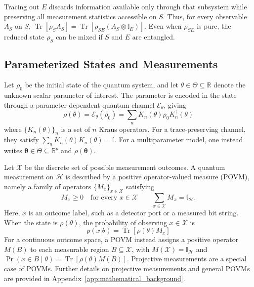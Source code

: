 \begin{remark}
    Tracing out $E$ discards information available only through that subsystem while preserving all measurement statistics accessible on $S$. Thus, for every observable $A_S$ on $S$, $\operatorname{Tr}[\rho_S A_S]=\operatorname{Tr}[\rho_{SE}(A_S\otimes\mathbb{I}_E)]$. Even when $\rho_{SE}$ is pure, the reduced state $\rho_S$ can be mixed if $S$ and $E$ are entangled.
\end{remark}

\subsection{Parameterized States and Measurements}

\begin{definition}
    Let $\rho_0$ be the initial state of the quantum system, and let $\theta\in\Theta\subseteq\mathbb{R}$ denote the unknown scalar parameter of interest. The parameter is encoded in the state through a parameter-dependent quantum channel $\mathcal{E}_\theta$, giving
    \begin{equation}
        \rho(\theta)
        = \mathcal{E}_\theta(\rho_0)
        = \sum_n K_n(\theta)\rho_0K_n^\dagger(\theta)
    \end{equation}
    where $\{K_n(\theta)\}_n$ is a set of $n$ Kraus operators. For a trace-preserving channel, they satisfy $\sum_n K_n^\dagger(\theta)K_n(\theta)=\mathbb{I}$.
    For a multiparameter model, one instead writes $\boldsymbol{\theta}\in\Theta\subseteq\mathbb{R}^p$ and $\rho(\boldsymbol{\theta})$.
\end{definition}


\begin{definition}
    Let $\mathcal{X}$ be the discrete set of possible measurement outcomes. A quantum measurement on $\mathcal{H}$ is described by a positive operator-valued measure (POVM), namely a family of operators $\{M_x\}_{x\in\mathcal{X}}$ satisfying
    \begin{equation}
        M_x\geq 0 \quad \text{for every }x\in\mathcal{X}
        \qquad
        \sum_{x\in\mathcal{X}} M_x=\mathbb{I}_{\mathcal{H}}.
    \end{equation}
    Here, $x$ is an outcome label, such as a detector port or a measured bit string. When the state is $\rho(\theta)$, the probability of observing $x\in\mathcal{X}$ is
    \begin{equation}
        p(x|\theta)
        =\operatorname{Tr}\!\left[\rho(\theta)M_x\right]
        \label{eq:povm_def}
    \end{equation}
    For a continuous outcome space, a POVM instead assigns a positive operator $M(B)$ to each measurable region $B\subseteq\mathcal{X}$, with $M(\mathcal{X})=\mathbb{I}_{\mathcal{H}}$ and $\Pr(x\in B\mid\theta)=\operatorname{Tr}[\rho(\theta)M(B)]$. Projective measurements are a special case of POVMs. Further details on projective measurements and general POVMs are provided in Appendix~\ref{app:mathematical_background}.
\end{definition}

